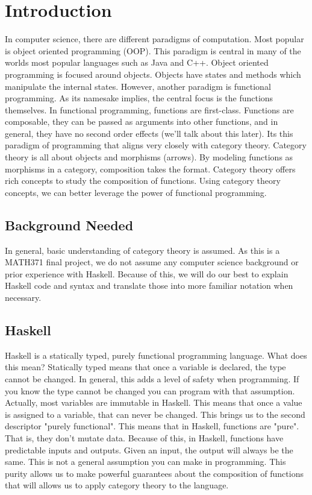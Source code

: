 \chapter{Introduction}

In computer science, there are different paradigms of computation. Most popular is object oriented programming (OOP). This paradigm is central in many of the worlds most popular languages such as Java and C++. Object oriented programming is focused around objects. Objects have states and methods which manipulate the internal states. However, another paradigm is functional programming. As its namesake implies, the central focus is the functions themselves. In functional programming, functions are first-class. Functions are composable, they can be passed as arguments into other functions, and in general, they have no second order effects (we'll talk about this later). Its this paradigm of programming that aligns very closely with category theory. Category theory is all about objects and morphisms (arrows). By modeling functions as morphisms in a category, composition takes the format. Category theory offers rich concepts to study the composition of functions. Using category theory concepts, we can better leverage the power of functional programming.

\section{Background Needed}
In general, basic understanding of category theory is assumed. As this is a MATH371 final project, we do not assume any computer science background or prior experience with Haskell. Because of this, we will do our best to explain Haskell code and syntax and translate those into more familiar notation when necessary. 

\section{Haskell}
Haskell is a statically typed, purely functional programming language. What does this mean? Statically typed means that once a variable is declared, the type cannot be changed. In general, this adds a level of safety when programming. If you know the type cannot be changed you can program with that assumption. Actually, most variables are immutable in Haskell. This means that once a value is assigned to a variable, that can never be changed.  This brings us to the second descriptor "purely functional". This means that in Haskell, functions are "pure". That is, they don't mutate data. Because of this, in Haskell, functions have predictable inputs and outputs. Given an input, the output will always be the same. This is not a general assumption you can make in programming. This purity allows us to make powerful guarantees about the composition of functions that will allows us to apply category theory to the language.

